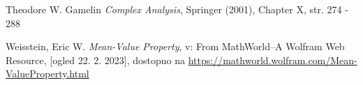 \documentclass[mat1]{fmfdelo}
\begin{document}
\newpage


\begin{thebibliography}{9}
    Theodore W. Gamelin \emph{Complex Analysis}, Springer (2001), Chapter X, str. 274 - 288

    Weisstein, Eric W. \emph{Mean-Value Property}, v: From MathWorld--A Wolfram Web Resource, [ogled 22. 2. 2023], dostopno na \href{https://mathworld.wolfram.com/Mean-ValueProperty.html}{https://mathworld.wolfram.com/Mean-ValueProperty.html}
\end{thebibliography}
\end{document}
